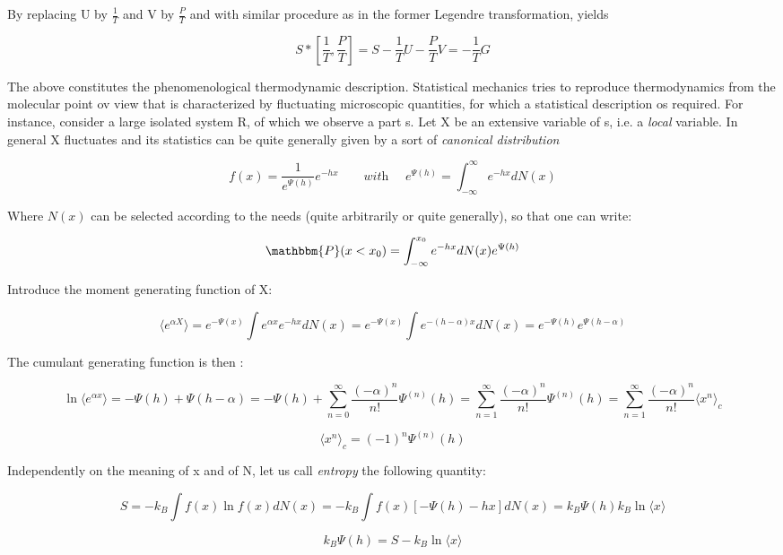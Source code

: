 \documentclass{article}
\begin{document}
By replacing U by $ \frac{1}{T}$ and V by $ \frac{P}{T}$ and with similar procedure as in the former Legendre transformation, yields

$$S*[ \frac{1}{T}, \frac{P}{T}] = S -  \frac{1}{T} U -  \frac{P}{T} V =  - \frac{1}{T} G$$

The above constitutes the phenomenological thermodynamic description. Statistical mechanics tries to reproduce thermodynamics from the molecular point ov view that is characterized by fluctuating microscopic quantities, for which a statistical description os required. For instance, consider a large isolated system R, of which we observe a part s. Let X be an extensive variable of s, i.e. a \textit{local} variable.
In general X fluctuates and its statistics can be quite generally given by a sort of \emph{canonical distribution}


$$ f(x) = \frac{1}{e^{\Psi(h)}} e^{-hx} \quad \quad \textit{with } \quad e^{\Psi(h)} = \int_{-\infty}^{\infty} e^{-hx} dN(x)$$

Where $N(x)$ can be selected according to the needs (quite arbitrarily or quite generally), so that one can write:

$$\mathbbm{P}(x < x_0) = \int_{-\infty}^{x_0} e^{-hx} dN(x) e^{\Psi(h)}$$

Introduce the moment generating function of X:

\begin{equation}
\langle e^{\alpha X} \rangle = e^{-\Psi(x)} \int e^{\alpha x} e^{-hx} dN(x) = e^{-\Psi(x)} \int e^{-(h-\alpha) x} dN(x) = e^{-\Psi(h)} e^{\Psi(h-\alpha)}
\end{equation}

The cumulant generating function is then :

$$
\ln \langle e^{\alpha x} \rangle = -\Psi(h) + \Psi(h-\alpha) = -\Psi(h) + \sum_{n=0}^{\infty} \frac{(-\alpha)^n}{n!} \Psi^{(n)}(h) = \sum_{n=1}^{\infty} \frac{(-\alpha)^n}{n!} \Psi^{(n)}(h) = \sum_{n=1}^{\infty} \frac{(-\alpha)^n}{n!} \langle x^n \rangle_c
$$

\begin{equation}
\langle x^n \rangle_c = (-1)^n \Psi^{(n)}(h)	
\end{equation}

Independently on the meaning of x and of N, let us call \emph{entropy} the following quantity:

$$S = - k_B \int f(x) \ln f(x) dN(x) =- k_B \int f(x)[-\Psi(h) -hx ] dN(x) = k_B \Psi(h) k_B \ln \langle x \rangle $$

\begin{equation}
k_B \Psi(h) = S - k_B \ln \langle x \rangle
\end{equation}
\end{document}
